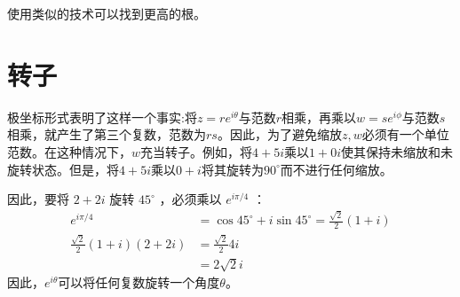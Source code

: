 使用类似的技术可以找到更高的根。

\section{转子}
极坐标形式表明了这样一个事实:将$z=r e^{i \theta}$与范数$r$相乘，再乘以$w=s e^{i \phi}$与范数$s$相乘，就产生了第三个复数，范数为$r s$。因此，为了避免缩放$z, w$必须有一个单位范数。在这种情况下，$w$充当转子。例如，将$4+5 i$乘以$1+0 i$使其保持未缩放和未旋转状态。但是，将$4+5 i$乘以$0+i$将其旋转为$90^{\circ}$而不进行任何缩放。

因此，要将 $2+2 i$ 旋转 $45^{\circ}$ ，必须乘以 $e^{i \pi / 4}$ ：
$$
    \begin{aligned}
        e^{i \pi / 4}                  & =\cos 45^{\circ}+i \sin 45^{\circ}=\frac{\sqrt{2}}{2}(1+i) \\
        \frac{\sqrt{2}}{2}(1+i)(2+2 i) & =\frac{\sqrt{2}}{2} 4 i                                    \\
                                       & =2 \sqrt{2} i
    \end{aligned}
$$
因此，$e^{i \theta}$可以将任何复数旋转一个角度$\theta$。

